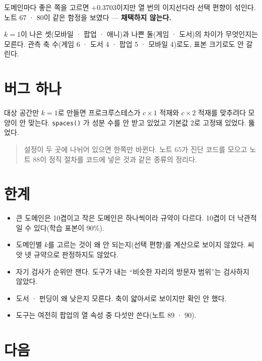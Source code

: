 \documentclass[10pt]{article}
\begin{document}
{도메인마다 좋은 쪽을 고르면 $+$0.3703이지만 열 번의 이지선다라 선택 편향이
섞인다. 노트 67 · 80이 같은 함정을 보였다 --- \textbf{채택하지 않는다.}}

$k{=}1$이 나은 셋(모바일 · 팝업 · 애니)과 나쁜 둘(게임 · 도서)의 차이가
무엇인지는 모른다. 관측 축 수(게임 6 · 도서 4 · 팝업 5 · 모바일 4)로도,
표본 크기로도 안 갈린다.

\section{버그 하나}

대상 공간만 $k{=}1$로 만들면 프로크루스테스가 $c\times1$ 적재와 $c\times2$
적재를 맞추려다 모양이 안 맞는다. \texttt{spaces()} 가 성분 수를 안 받고 있었고
기본값 2로 고정돼 있었다. 뚫었다.

\begin{quote}\fontsize{9.5}{11.5}\selectfont
설정이 두 곳에 나뉘어 있으면 한쪽만 바뀐다. 노트 65가 진단 코드를 모으고
노트 88이 정직 절차를 코드에 넣은 것과 같은 종류의 정리다.
\end{quote}

\section{한계}

\begin{itemize}[leftmargin=1.1em,itemsep=0.15em]
\item 큰 도메인은 10겹이고 작은 도메인은 하나씩이라 규약이 다르다. 10겹이
      더 낙관적일 수 있다(학습 표본이 90\%).
\item 도메인별 $k$를 고르는 것이 왜 안 되는지(선택 편향)를 계산으로 보이지
      않았다. 씨앗 넷 규약으로 판정하지도 않았다.
\item 자기 검사가 순위만 잰다. 도구가 내는 ``비슷한 자리의 방문자 범위''는
      검사하지 않았다.
\item 도서 · 펀딩이 왜 낮은지 모른다. 축이 얇아서로 보이지만 확인 안 했다.
\item 도구는 여전히 팝업의 열 속성 중 다섯만 쓴다(노트 89 · 90).
\end{itemize}

\section{다음}
\end{document}

